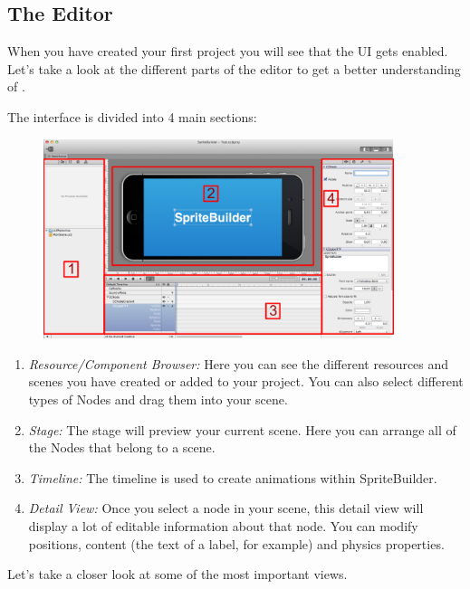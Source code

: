 \subsection{The Editor}
When you have created your first \SB{} project you will see that the \SB{} UI
gets enabled. Let's take a look at the different parts of the editor to get a
better understanding of \SB{}.

The \SB{} interface is divided into 4 main sections:
\begin{figure}[H]
		\centering
		\includegraphics[width=290pt]{images/spritebuilder/spritebuilder_ui.png}     
\end{figure} 
\begin{enumerate}
  \item \textit{Resource/Component Browser:} Here you can see the different
  resources and scenes you have created or added to your project. You can also select different types of Nodes and drag them into your scene.
  \item \textit{Stage:} The stage will preview your current scene. Here you can
  arrange all of the Nodes that belong to a scene. 
  \item \textit{Timeline:} The timeline is used to create animations within
  SpriteBuilder.
  \item \textit{Detail View:} Once you select a node in your scene, this detail
  view will display a lot of editable information about that node. You can modify positions, content (the text of a label, for example) and physics properties.
\end{enumerate}
Let's take a closer look at some of the most important views.

